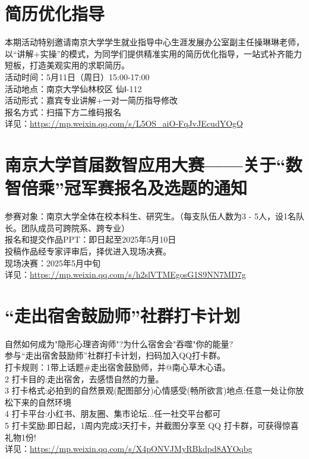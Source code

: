\documentclass[letterpaper, 12pt]{article}
\begin{document}
\begin{multicols}{2}
\section{简历优化指导} %
本期活动特别邀请南京大学学生就业指导中心生涯发展办公室副主任操琳琳老师，以“讲解+实操”的模式，为同学们提供精准实用的简历优化指导，一站式补齐能力短板，打造美观实用的求职简历。
\\活动时间：5月11日（周日）15:00-17:00
\\活动地点：南京大学仙林校区 仙Ⅰ-112
\\活动形式：嘉宾专业讲解+一对一简历指导修改
\\报名方式：扫描下方二维码报名
\\详见：\url{https://mp.weixin.qq.com/s/L5OS_aiO-FqJvJEcudYOgQ}

\section{南京大学首届数智应用大赛——关于“数智倍乘”冠军赛报名及选题的通知} %
参赛对象：南京大学全体在校本科生、研究生。（每支队伍人数为3 - 5人，设1名队长。团队成员可跨院系、跨专业）
\\报名和提交作品PPT：即日起至2025年5月10日
\\投稿作品经专家评审后，择优进入现场决赛。
\\现场决赛：2025年5月中旬
\\详见：\url{https://mp.weixin.qq.com/s/h2slVTMEgosG1S9NN7MD7g}





\section{“走出宿舍鼓励师”社群打卡计划} %
自然如何成为"隐形心理咨询师"?为什么宿舍会"吞噬"你的能量?
\\参与“走出宿舍鼓励师”社群打卡计划，扫码加入QQ打卡群。
\\打卡规则：1带上话题\#走出宿舍鼓励师，并@南心草木心语。
\\2 打卡目的:走出宿舍，去感悟自然的力量。
\\3 打卡格式:必拍到的自然景观(配图部分)心情感受(畅所欲言)地点:任意一处让你放松下来的自然环境
\\4 打卡平台:小红书、朋友圈、集市论坛...任一社交平台都可
\\5 打卡奖励:即日起，1周内完成3天打卡，并截图分享至 QQ 打卡群，可获得惊喜礼物1份!
\\详见：\url{https://mp.weixin.qq.com/s/X4pONVJMyRBkdpd8AYOqbg}


\end{multicols}
\end{document}
